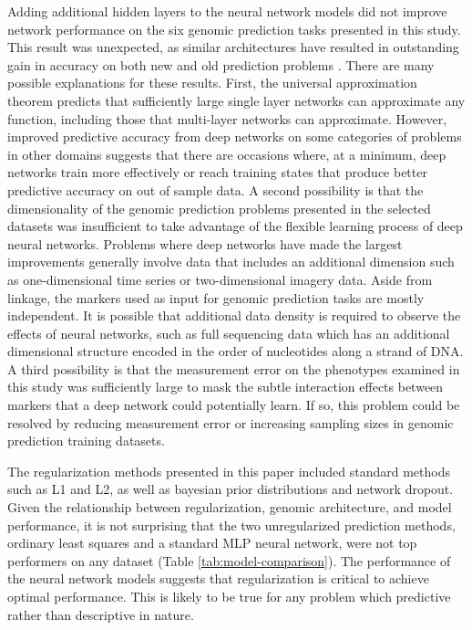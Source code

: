 Adding additional hidden layers to the neural network models did not improve
network performance on the six genomic prediction tasks presented in this study.
This result was unexpected, as similar architectures have resulted in outstanding 
gain in accuracy on both new and old prediction problems \citep{subasi2005, lang1990, mnih2013}.
There are many possible explanations for these results. First, the universal
approximation theorem predicts that sufficiently large single layer networks
can approximate any function, including those that multi-layer networks can approximate.
However, improved predictive accuracy from deep networks on some categories of problems
in other domains suggests that there are occasions where, 
at a minimum, deep networks train more effectively or reach training states that 
produce better predictive accuracy on out of sample data.
A second possibility is that the dimensionality of the genomic prediction problems
presented in the selected datasets was insufficient to take advantage of the
flexible learning process of deep neural networks. Problems where deep networks have
made the largest improvements generally involve data that includes an additional dimension
such as one-dimensional time series or two-dimensional imagery data. Aside from linkage, the markers used as 
input for genomic prediction tasks are mostly independent. It is possible that 
additional data density is required to observe the effects of neural networks, 
such as full sequencing data which has an additional dimensional structure encoded 
in the order of nucleotides along a strand of DNA. A third possibility is that 
the measurement error on the phenotypes examined in this study was sufficiently 
large to mask the subtle interaction effects between markers that a deep 
network could potentially learn. If so, this problem could be resolved by reducing 
measurement error or increasing sampling sizes in genomic prediction training datasets.  

The regularization methods presented in this paper included standard methods such 
as L1 and L2, as well as bayesian prior distributions and network dropout. 
Given the relationship between regularization, genomic architecture, and model 
performance, it is not surprising that the two unregularized prediction methods, 
ordinary least squares and a standard MLP neural network, were not top performers 
on any dataset (Table \ref{tab:model-comparison}). The performance of the neural 
network models suggests that regularization is critical to achieve optimal 
performance. This is likely to be true for any problem which predictive rather 
than descriptive in nature.

